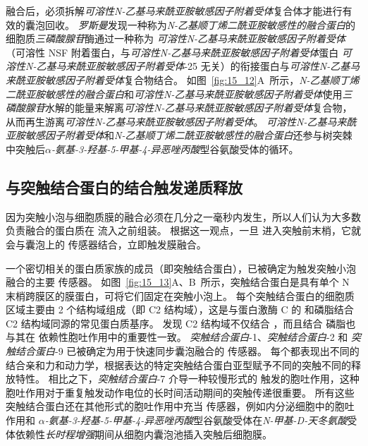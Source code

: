 融合后，必须拆解\textit{可溶性N-乙基马来酰亚胺敏感因子附着受体}复合体才能进行有效的囊泡回收。
\textit{罗斯曼}发现一种称为\textit{N-乙基顺丁烯二酰亚胺敏感性的融合蛋白}的细胞质\textit{三磷酸腺苷}酶通过一种称为 \textit{可溶性N-乙基马来酰亚胺敏感因子附着受体}（可溶性 NSF 附着蛋白，与\textit{可溶性N-乙基马来酰亚胺敏感因子附着受体}蛋白 \textit{可溶性N-乙基马来酰亚胺敏感因子附着受体}-25 无关）的衔接蛋白与\textit{可溶性N-乙基马来酰亚胺敏感因子附着受体}复合物结合。
如图~\ref{fig:15_12}A~所示，\textit{N-乙基顺丁烯二酰亚胺敏感性的融合蛋白}和\textit{可溶性N-乙基马来酰亚胺敏感因子附着受体}使用\textit{三磷酸腺苷}水解的能量来解离\textit{可溶性N-乙基马来酰亚胺敏感因子附着受体}复合物，从而再生游离\textit{可溶性N-乙基马来酰亚胺敏感因子附着受体}。
\textit{可溶性N-乙基马来酰亚胺敏感因子附着受体}和\textit{N-乙基顺丁烯二酰亚胺敏感性的融合蛋白}还参与树突棘中突触后\textit{$\alpha$-氨基-3-羟基-5-甲基-4-异恶唑丙酸}型谷氨酸受体的循环。



\subsection{与突触结合蛋白的结合触发递质释放}

因为突触小泡与细胞质膜的融合必须在几分之一毫秒内发生，所以人们认为大多数负责融合的蛋白质在  流入之前组装。
根据这一观点，一旦  进入突触前末梢，它就会与囊泡上的  传感器结合，立即触发膜融合。


一个密切相关的蛋白质家族的成员（即突触结合蛋白），已被确定为触发突触小泡融合的主要  传感器。
如图~\ref{fig:15_13}A、B~所示，突触结合蛋白是具有单个 N 末梢跨膜区的膜蛋白，可将它们固定在突触小泡上。
每个突触结合蛋白的细胞质区域主要由 2 个结构域组成（即 C2 结构域），这是与蛋白激酶 C 的  和磷脂结合 C2 结构域同源的常见蛋白质基序。
发现 C2 结构域不仅结合 ，而且结合 磷脂也与其在  依赖性胞吐作用中的重要性一致。
\textit{突触结合蛋白}-1、\textit{突触结合蛋白}-2 和 \textit{突触结合蛋白}-9 已被确定为用于快速同步囊泡融合的  传感器。
每个都表现出不同的  结合亲和力和动力学，根据表达的特定突触结合蛋白亚型赋予不同的突触不同的释放特性。
相比之下，\textit{突触结合蛋白}-7 介导一种较慢形式的  触发的胞吐作用，这种胞吐作用对于重复触发动作电位的长时间活动期间的突触传递很重要。
所有这些突触结合蛋白还在其他形式的胞吐作用中充当  传感器，例如内分泌细胞中的胞吐作用和 \textit{$\alpha$-氨基-3-羟基-5-甲基-4-异恶唑丙酸}型谷氨酸受体在\textit{N-甲基-D-天冬氨酸}受体依赖性\textit{长时程增强}期间从细胞内囊泡池插入突触后细胞膜。


